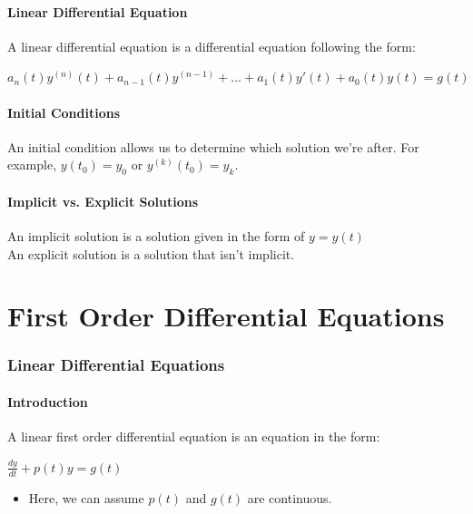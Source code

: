 \documentclass{article}
\begin{document}
\subsection{Linear Differential Equation}

A linear differential equation is a differential equation following the form:

\begin{center}
    $a_n (t) y^{(n)}(t) + a_{n - 1} (t) y^{(n-1)} + ... + a_1 (t) y' (t) + a_0 (t) y (t) = g(t)$ 
\end{center}

\subsection{Initial Conditions}

An initial condition allows us to determine which solution we're after. For example, $y(t_0) = y_0$ or $y^{(k)}(t_0) = y_k$.

\subsection{Implicit vs. Explicit Solutions}

An implicit solution is a solution given in the form of $y = y(t)$ \\
An explicit solution is a solution that isn't implicit. 

\part{First Order Differential Equations}
\section{Linear Differential Equations}
\subsection{Introduction}
A linear first order differential equation is an equation in the form:

\begin{center}
    $\frac{dy}{dt} + p(t)y = g(t)$
\end{center}

\begin{itemize}
    \item Here, we can assume $p(t)$ and $g(t)$ are continuous.
\end{itemize}
\end{document}
